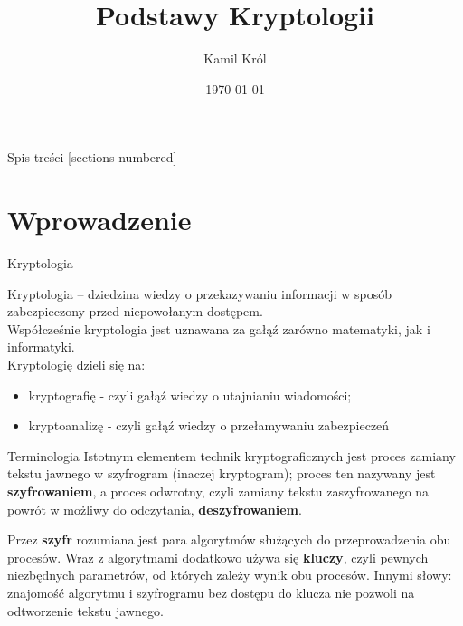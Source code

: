 \documentclass[10pt]{beamer}
\title{Podstawy Kryptologii}
\subtitle{}
\date{\today}
\author{Kamil Król}
\institute{Politechnika Śląska, Wydział Matematyki Stosowanej}
\begin{document}
\maketitle

\begin{frame}{Spis treści}
  [sections numbered]
  \tableofcontents[hideallsubsections]
\end{frame}

\section{Wprowadzenie}

\begin{frame}[fragile]{Kryptologia}
 
Kryptologia – dziedzina wiedzy o przekazywaniu informacji w sposób zabezpieczony przed niepowołanym dostępem.\\
Współcześnie kryptologia jest uznawana za gałąź zarówno matematyki, jak i informatyki.\\

Kryptologię dzieli się na:\\

\begin{itemize}
    \item kryptografię - czyli gałąź wiedzy o utajnianiu wiadomości;
    
    \item kryptoanalizę - czyli gałąź wiedzy o przełamywaniu zabezpieczeń
  \end{itemize}
  
\end{frame}
\begin{frame}[fragile]{Terminologia}
  Istotnym elementem technik kryptograficznych jest proces zamiany tekstu jawnego w szyfrogram (inaczej kryptogram); proces ten nazywany jest \textbf{szyfrowaniem}, a proces odwrotny, czyli zamiany tekstu zaszyfrowanego na powrót w możliwy do odczytania, \textbf{deszyfrowaniem}.
  
  
  Przez \textbf{szyfr} rozumiana jest para algorytmów służących do przeprowadzenia obu procesów. Wraz z algorytmami dodatkowo używa się \textbf{kluczy}, czyli pewnych niezbędnych parametrów, od których zależy wynik obu procesów. Innymi słowy: znajomość algorytmu i szyfrogramu bez dostępu do klucza nie pozwoli na odtworzenie tekstu jawnego.
\end{frame}
\end{document}
